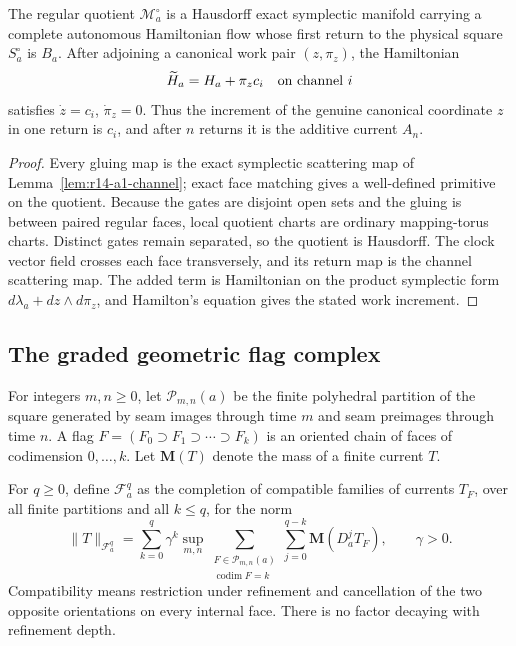 \begin{theorem}
\label{thm:r14-a1-impact}
The regular quotient \(\mathcal M_a^\circ\) is a Hausdorff exact symplectic
manifold carrying a complete autonomous Hamiltonian flow whose first return
to the physical square \(S_a^\circ\) is \(B_a\).  After adjoining a canonical
work pair \((z,\pi_z)\), the Hamiltonian
\[
 \widetilde H_a=H_a+\pi_z c_i\quad\hbox{on channel }i
\]
satisfies \(\dot z=c_i\), \(\dot\pi_z=0\).  Thus the increment of the genuine
canonical coordinate \(z\) in one return is \(c_i\), and after \(n\) returns
it is the additive current \(A_n\).
\end{theorem}

\begin{proof}
Every gluing map is the exact symplectic scattering map of
Lemma~\ref{lem:r14-a1-channel}; exact face matching gives a well-defined
primitive on the quotient.  Because the gates are disjoint open sets and the
gluing is between paired regular faces, local quotient charts are ordinary
mapping-torus charts.  Distinct gates remain separated, so the quotient is
Hausdorff.  The clock vector field crosses each face transversely, and its
return map is the channel scattering map.  The added term is Hamiltonian on
the product symplectic form
\(d\lambda_a+dz\wedge d\pi_z\), and Hamilton's equation gives the stated work
increment.
\end{proof}

\subsection{The graded geometric flag complex}

For integers \(m,n\ge0\), let \(\mathcal P_{m,n}(a)\) be the finite
polyhedral partition of the square generated by seam images through time
\(m\) and seam preimages through time \(n\).  A flag
\(F=(F_0\supset F_1\supset\cdots\supset F_k)\) is an oriented chain of faces
of codimension \(0,\ldots,k\).  Let \(\mathbf M(T)\) denote the mass of a
finite current \(T\).

For \(q\ge0\), define \(\mathscr F_a^q\) as the completion of compatible
families of currents \(T_F\), over all finite partitions and all
\(k\le q\), for the norm
\[
 \|T\|_{\mathscr F_a^q}
 =
 \sum_{k=0}^q \gamma^k
 \sup_{m,n}
 \sum_{\substack{F\in\mathcal P_{m,n}(a)\\\operatorname{codim}F=k}}
 \sum_{j=0}^{q-k}\mathbf M(D_a^jT_F),
 \qquad \gamma>0.
\]
Compatibility means restriction under refinement and cancellation of the two
opposite orientations on every internal face.  There is no factor decaying
with refinement depth.

